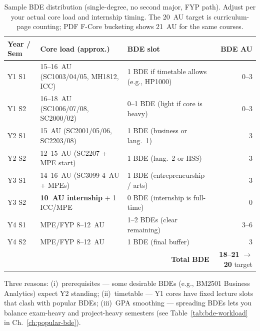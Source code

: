\begin{table}[h]
\centering
\small
\renewcommand{\arraystretch}{1.22}
\begin{tabular}{@{}l l p{5.8cm} r@{}}
\toprule
Year / Sem & Core load (approx.) & BDE slot & BDE AU \\
\midrule
Y1 S1 & 15--16~AU (SC1003/04/05, MH1812, ICC) & 1 BDE if timetable allows (e.g., HP1000) & 0--3 \\
Y1 S2 & 16--18~AU (SC1006/07/08, SC2000/02) & 0--1 BDE (light if core is heavy) & 0--3 \\
Y2 S1 & 15~AU (SC2001/05/06, SC2203/08) & 1 BDE (business or lang.~1) & 3 \\
Y2 S2 & 12--15~AU (SC2207 + MPE start) & 1 BDE (lang.~2 or HSS) & 3 \\
Y3 S1 & 14--16~AU (SC3099 4~AU + MPEs) & 1 BDE (entrepreneurship / arts) & 3 \\
Y3 S2 & \textbf{10~AU internship} + 1 ICC/MPE & 0 BDE (internship is full-time) & 0 \\
Y4 S1 & MPE/FYP 8--12~AU & 1--2 BDEs (clear remaining) & 3--6 \\
Y4 S2 & MPE/FYP 8--12~AU & 1 BDE (final buffer) & 3 \\
\midrule
\multicolumn{3}{r}{\textbf{Total BDE}} & \textbf{18--21} $\to$ \textbf{20} target \\
\bottomrule
\end{tabular}
\caption{Sample BDE distribution (single-degree, no second major, FYP path). Adjust per your actual core load and internship timing. The 20~AU target is curriculum-page counting; PDF F-Core bucketing shows 21~AU for the same courses.}
\label{tab:bde-timeline}
\end{table}

\begin{remark}
Three reasons: (i)~prerequisites --- some desirable BDEs (e.g., BM2501 Business Analytics) expect Y2 standing; (ii)~timetable --- Y1 cores have fixed lecture slots that clash with popular BDEs; (iii)~GPA smoothing --- spreading BDEs lets you balance exam-heavy and project-heavy semesters (see Table~\ref{tab:bde-workload} in Ch.~\ref{ch:popular-bde}).
\end{remark}


